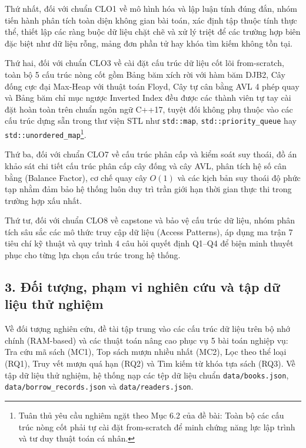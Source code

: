 \documentclass[14pt,a4paper]{extarticle}
\begin{document}
Thứ nhất, đối với chuẩn CLO1 về mô hình hóa và lập luận tính đúng đắn, nhóm tiến hành phân tích toàn diện không gian bài toán, xác định tập thuộc tính thực thể, thiết lập các ràng buộc dữ liệu chặt chẽ và xử lý triệt để các trường hợp biên đặc biệt như dữ liệu rỗng, mảng đơn phần tử hay khóa tìm kiếm không tồn tại.

Thứ hai, đối với chuẩn CLO3 về cài đặt cấu trúc dữ liệu cốt lõi from-scratch, toàn bộ 5 cấu trúc nòng cốt gồm Bảng băm xích rời với hàm băm DJB2, Cây đống cực đại Max-Heap với thuật toán Floyd, Cây tự cân bằng AVL 4 phép quay và Bảng băm chỉ mục ngược Inverted Index đều được các thành viên tự tay cài đặt hoàn toàn trên chuẩn ngôn ngữ C++17, tuyệt đối không phụ thuộc vào các cấu trúc dựng sẵn trong thư viện STL như \texttt{std::map}, \texttt{std::priority\_queue} hay \texttt{std::unordered\_map}\footnote{Tuân thủ yêu cầu nghiêm ngặt theo Mục 6.2 của đề bài: Toàn bộ các cấu trúc nòng cốt phải tự cài đặt from-scratch để minh chứng năng lực lập trình và tư duy thuật toán cá nhân.}.

Thứ ba, đối với chuẩn CLO7 về cấu trúc phân cấp và kiểm soát suy thoái, đồ án khảo sát chi tiết cấu trúc phân cấp cây đống và cây AVL, phân tích hệ số cân bằng (Balance Factor), cơ chế quay cây $O(1)$ và các kịch bản suy thoái độ phức tạp nhằm đảm bảo hệ thống luôn duy trì trần giới hạn thời gian thực thi trong trường hợp xấu nhất.

Thứ tư, đối với chuẩn CLO8 về capstone và bảo vệ cấu trúc dữ liệu, nhóm phân tích sâu sắc các mô thức truy cập dữ liệu (Access Patterns), áp dụng ma trận 7 tiêu chí kỹ thuật và quy trình 4 câu hỏi quyết định Q1--Q4 để biện minh thuyết phục cho từng lựa chọn cấu trúc trong hệ thống.

\subsection*{3. Đối tượng, phạm vi nghiên cứu và tập dữ liệu thử nghiệm}

Về đối tượng nghiên cứu, đề tài tập trung vào các cấu trúc dữ liệu trên bộ nhớ chính (RAM-based) và các thuật toán nâng cao phục vụ 5 bài toán nghiệp vụ: Tra cứu mã sách (MC1), Top sách mượn nhiều nhất (MC2), Lọc theo thể loại (RQ1), Truy vết mượn quá hạn (RQ2) và Tìm kiếm từ khóa tựa sách (RQ3). Về tập dữ liệu thử nghiệm, hệ thống nạp các tệp dữ liệu chuẩn \texttt{data/books.json}, \texttt{data/borrow\_records.json} và \texttt{data/readers.json}.
\end{document}
